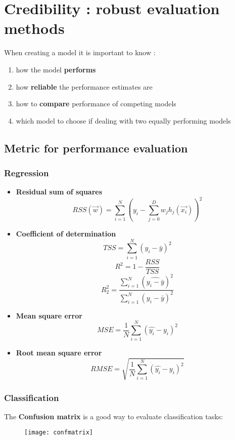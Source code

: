 \newpage
\section{Credibility : robust evaluation methods}
When creating a model it is important to know :
\begin{enumerate}
\item how the model \textbf{performs}
\item how \textbf{reliable} the performance estimates are
\item how to \textbf{compare} performance of competing models
\item which model to choose if dealing with two equally performing models
\end{enumerate}

\subsection{Metric for performance evaluation}
\subsubsection{Regression}
\begin{itemize}
\item \textbf{Residual sum of squares}
$$ RSS(\overrightarrow{w}) = \sum \limits_{i=1}^{N} \left( y_i - \sum \limits_{j=0}^{D} w_jh_j(\overrightarrow{x_i}) \right)^2 $$
\item \textbf{Coefficient of determination}
$$ TSS = \sum \limits_{i=1}^{N}(y_i - \bar{y})^2$$
$$ R^2 = 1- \frac{RSS}{TSS}$$
$$ R^2_2 =  \frac{\sum \limits_{i=1}^{N}(\hat{y_i - \bar{y}})^2}{\sum \limits_{i=1}^{N}(y_i - \bar{y})^2}$$
\item \textbf{Mean square error}
$$ MSE= \frac{1}{N}\sum \limits_{i=1}^{N} (\hat{y_i}- y_i)^2$$
\item \textbf{Root mean square error}
$$ RMSE= \sqrt{\frac{1}{N}\sum \limits_{i=1}^{N} (\hat{y_i}- y_i)^2}$$
\end{itemize}
\subsubsection{Classification}
The \textbf{Confusion matrix} is a good way to evaluate classification tasks:
\begin{figure}[H]
  \centering
  \texttt{[image: confmatrix]}
\end{figure}

